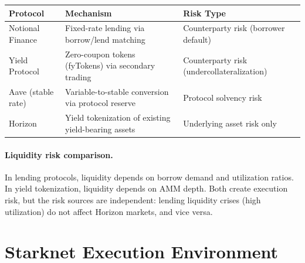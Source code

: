 \begin{center}
\begin{tabularx}{\textwidth}{l >{\raggedright\arraybackslash}X >{\raggedright\arraybackslash}X}
\toprule
\textbf{Protocol} & \textbf{Mechanism} & \textbf{Risk Type} \\
\midrule
Notional Finance & Fixed-rate lending via borrow/lend matching & Counterparty risk (borrower default) \\
Yield Protocol & Zero-coupon tokens (fyTokens) via secondary trading & Counterparty risk (undercollateralization) \\
Aave (stable rate) & Variable-to-stable conversion via protocol reserve & Protocol solvency risk \\
\midrule
Horizon & Yield tokenization of existing yield-bearing assets & Underlying asset risk only \\
\bottomrule
\end{tabularx}
\end{center}

\begin{center}
\end{center}

\paragraph{Liquidity risk comparison.}
In lending protocols, liquidity depends on borrow demand and utilization ratios. In yield tokenization, liquidity depends on AMM depth. Both create execution risk, but the risk sources are independent: lending liquidity crises (high utilization) do not affect Horizon markets, and vice versa.


\section{Starknet Execution Environment}

